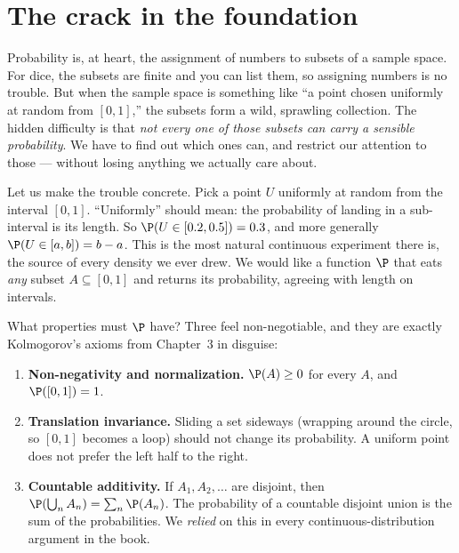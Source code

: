 \section{The crack in the foundation}
\label{ch36:crack}

\begin{intuitionbox}
Probability is, at heart, the assignment of numbers to subsets of a sample space.
For dice, the subsets are finite and you can list them, so assigning numbers is no
trouble. But when the sample space is something like ``a point chosen uniformly at
random from $[0,1]$,'' the subsets form a wild, sprawling collection. The hidden
difficulty is that \emph{not every one of those subsets can carry a
sensible probability}. We have to find out which ones can, and restrict our
attention to those --- without losing anything we actually care about.
\end{intuitionbox}

Let us make the trouble concrete. Pick a point $U$ uniformly at random from the
interval $[0,1]$. ``Uniformly'' should mean: the probability of landing in a
sub-interval is its length. So $\P(U \in [0.2,0.5]) = 0.3$, and more generally
$\P(U \in [a,b]) = b-a$. This is the most natural continuous experiment there is,
the source of every density we ever drew. We would like a function $\P$ that eats
\emph{any} subset $A \subseteq [0,1]$ and returns its probability, agreeing with
length on intervals.

What properties must $\P$ have? Three feel non-negotiable, and they are exactly
Kolmogorov's axioms from Chapter~3 in disguise:

\begin{enumerate}
  \item \textbf{Non-negativity and normalization.} $\P(A) \ge 0$ for every $A$,
        and $\P([0,1]) = 1$.
  \item \textbf{Translation invariance.} Sliding a set sideways (wrapping around
        the circle, so $[0,1]$ becomes a loop) should not change its probability.
        A uniform point does not prefer the left half to the right.
  \item \textbf{Countable additivity.} If $A_1, A_2, \dots$ are disjoint, then
        $\P\!\left(\bigcup_n A_n\right) = \sum_n \P(A_n)$. The probability of a
        countable disjoint union is the sum of the probabilities. We \emph{relied}
        on this in every continuous-distribution argument in the book.
\end{enumerate}

